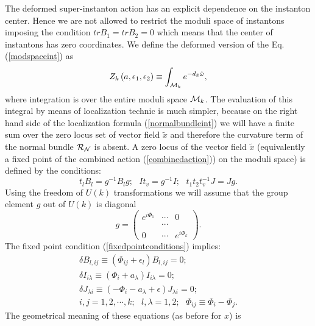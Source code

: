 \documentclass[a4paper,12pt]{article}
\begin{document}
The deformed super-instanton action has an explicit dependence on
the instanton center. Hence we are not allowed to restrict the
moduli space of instantons imposing the condition $tr B_1=tr
B_2=0$ which means that the center of instantons has zero
coordinates.  We define the deformed version of the Eq.
(\ref{modspaceint}) as
\begin{equation}
Z_k \left(a, \epsilon_1, \epsilon_2 \right)\equiv\int_{{\cal M}_k} e^{-d_{\tilde x}{\tilde \omega}},
\label{deformedmodspaceint}
\end{equation}
where integration is over the entire moduli space ${\cal M}_k$.
The evaluation of this integral by means of localization technic
is much simpler, because on the right hand side of the
localization formula (\ref{normalbundleint}) we will have a finite
sum over the zero locus set of vector field ${\tilde x}$ and
therefore the curvature term of the normal bundle ${\cal R}_{\cal
N}$ is absent. A zero locus of the vector field ${\tilde x}$
(equivalently a fixed point of the combined action
(\ref{combinedaction})) on the moduli space) is defined by the
conditions:
\begin{equation}
t_l B_l=g^{-1}B_lg ; \, \, \, \, It_v=g^{-1}I; \, \, \, \, t_1 t_2
t_v^{-1}J=J g. \label{fixedpointconditions}
\end{equation}
Using the freedom of $U(k)$ transformations we will assume that
the group element $g$ out of $U(k)$ is diagonal
\begin{equation}
g=\left( \begin{array}{ccc} e^{i\Phi_1} & \cdots & 0 \\
 & \cdots &  \\
0 & \cdots & e^{i\Phi_k}
\end{array}
\right). \label{diagonaluk}
\end{equation}
The fixed point condition (\ref{fixedpointconditions}) implies:
\begin{eqnarray}
\delta B_{l,ij}\equiv \left(\Phi_{ij}+\epsilon_l\right)B_{l,ij}=0; \nonumber \\
\delta I_{i \lambda}\equiv \left(\Phi_i+a_{\lambda}\right)I_{i\lambda}=0; \nonumber \\
\delta J_{\lambda i}\equiv \left(-\Phi_i-a_{\lambda}+\epsilon \right)J_{\lambda i}=0; \nonumber \\
i,j=1,2, \cdots, k; \, \, \, \, l, \lambda=1,2; \, \, \, \,
\Phi_{ij}\equiv \Phi_i-\Phi_j. \label{fixedpointconditions'}
\end{eqnarray}
The geometrical meaning of these equations (as before for $x$) is
\end{document}

